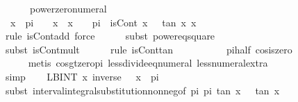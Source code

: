 \documentclass[leqno]{article}
\theoremstyle{definition}
\begin{document}
\begin{figure}
\begin{isabellebody}
\ \ \ \ \ \ power{\isacharunderscore}zero{\isacharunderscore}numeral{\isacharparenright}\isanewline
\ \ \isamarkupfalse%
\ {}{\isacharcolon}\ {\isachardoublequoteopen}{\isasymAnd}x{\isachardot}\ {\isacharminus}\ {\isacharparenleft}pi\ {\isacharslash}\ {}{\isacharparenright}\ {\isacharless}\ x\ {\isasymLongrightarrow}\ x\ {\isacharasterisk}\ {}\ {\isacharless}\ pi\ {\isasymLongrightarrow}\ isCont\ {\isacharparenleft}{\isasymlambda}x{\isachardot}\ {}\ {\isacharplus}\ {\isacharparenleft}tan\ x{\isacharparenright}\ x{\isachardoublequoteclose}\isanewline
\ \ \ \ \isamarkupfalse%
\ {\isacharparenleft}rule\ isCont{\isacharunderscore}add{\isacharcomma}\ force{\isacharparenright}\isanewline
\ \ \ \ \isamarkupfalse%
\ {\isacharparenleft}subst\ power{}{\isacharunderscore}eq{\isacharunderscore}square{\isacharparenright}\isanewline
\ \ \ \ \isamarkupfalse%
\ {\isacharparenleft}subst\ isCont{\isacharunderscore}mult{\isacharparenright}\isanewline
\ \ \ \ \isamarkupfalse%
\ {\isacharparenleft}rule\ isCont{\isacharunderscore}tan{\isacharparenright}\isanewline
\ \ \ \ \isanewline
\ \ \ \ \isamarkupfalse%
\ pi{\isacharunderscore}half\ cos{\isacharunderscore}is{\isacharunderscore}zero\isanewline
\ \ \ \ \isamarkupfalse%
\ {\isacharparenleft}metis\ cos{\isacharunderscore}gt{\isacharunderscore}zero{\isacharunderscore}pi\ less{\isacharunderscore}divide{\isacharunderscore}eq{\isacharunderscore}numeral{}{\isacharparenleft}{}{\isacharparenright}\ less{\isacharunderscore}numeral{\isacharunderscore}extra{\isacharparenleft}{}{\isacharparenright}{\isacharparenright}\isanewline
\ \ \ \ \isamarkupfalse%
\ simp\isanewline
\ \ \isamarkupfalse%
\ {\isachardoublequoteopen}LBINT\ x{\isacharequal}{\isacharminus}{\isasyminfinity}{\isachardot}{\isachardot}{\isasyminfinity}{\isachardot}\ inverse\ {\isacharparenleft}{}\ {\isacharplus}\ x{\isacharcircum}{}{\isacharparenright}\ {\isacharequal}\ pi{\isachardoublequoteclose}\isanewline
\ \ \ \ \isamarkupfalse%
\ {\isacharparenleft}subst\ interval{\isacharunderscore}integral{\isacharunderscore}substitution{\isacharunderscore}nonneg{\isacharbrackleft}of\ {\isachardoublequoteopen}{\isacharminus}pi{\isacharslash}{}{\isachardoublequoteclose}\ {\isachardoublequoteopen}pi{\isacharslash}{}{\isachardoublequoteclose}\ tan\ {\isachardoublequoteopen}{\isasymlambda}x{\isachardot}\ {}\ {\isacharplus}\ {\isacharparenleft}tan\ x{\isacharparenright}{\isacharcircum}{}{\isachardoublequoteclose}{\isacharbrackright}{\isacharparenright}\isanewline

\end{isabellebody}
\end{figure}
\end{document}
